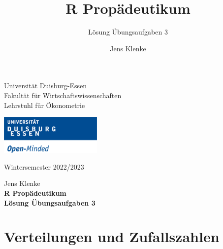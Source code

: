 \documentclass[12pt,a4paper]{article}
\title{R Propädeutikum}
\subtitle{Lösung Übungsaufgaben 3}
\author{Jens Klenke}
\date{}
\begin{document}





\restoregeometry



\begin{minipage}{0.6\textwidth}
Universität Duisburg-Essen\\
Fakultät für Wirtschaftswissenschaften\\
Lehrstuhl für Ökonometrie\\
\end{minipage}

	\begin{flushright}
	\vspace{-3cm}
	\includegraphics*[width=5cm]{includes/duelogo_en.png}\\
	\vspace{.125cm}
	\end{flushright}
\hspace{-0.005cm}Wintersemester 2022/2023

\vspace{0.05cm}

\begin{center}
	\vspace{.25cm}
	Jens Klenke \hspace{.5cm}  \\
	\vspace{.25cm}
	\textbf{\Large{R Propädeutikum}}\\
	\vspace{.25cm}
	\textbf{\large{Lösung Übungsaufgaben 3}}\\
	\vspace{.125cm}
\end{center}





\hypertarget{verteilungen-und-zufallszahlen}{%
\section{Verteilungen und
Zufallszahlen}\label{verteilungen-und-zufallszahlen}}
\end{document}
